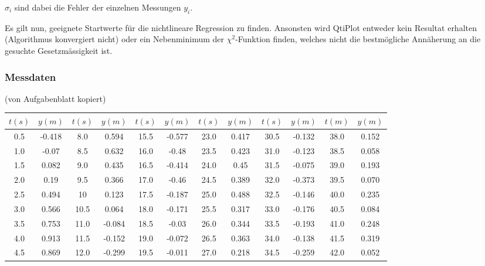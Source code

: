 $\sigma_i$ sind dabei die Fehler der einzelnen Messungen $y_i$.

Es  gilt  nun,  geeignete  Startwerte f\"ur  die  nichtlineare  Regression  zu
finden. Ansonsten wird  QtiPlot entweder  kein Resultat  erhalten (Algorithmus
konvergiert nicht) oder ein Nebenminimum der $\chi^2$-Funktion finden, welches
nicht die bestm\"ogliche Ann\"aherung an die gesuchte Gesetzm\"assigkeit ist.

\subsubsection{Messdaten}
(von Aufgabenblatt kopiert)

\begin{center}
    \begin{tabular}{*{12}{c}}
        \toprule
        $t(s)$  &  $y(m)$   &  $t(s)$   &  $y(m)$   &  $t(s)$  &  $y(m)$    &  $t(s)$   & $y(m)$    &  $t(s)$   &  $y(m)$   &  $t(m)$   &  $y(m)$ \\
        \midrule
        0.5     & -0.418    & 8.0       & 0.594     & 15.5     & -0.577     & 23.0      & 0.417     & 30.5      & -0.132    & 38.0      & 0.152   \\
        1.0     & -0.07     & 8.5       & 0.632     & 16.0     & -0.48      & 23.5      & 0.423     & 31.0      & -0.123    & 38.5      & 0.058   \\
        1.5     & 0.082     & 9.0       & 0.435     & 16.5     & -0.414     & 24.0      & 0.45      & 31.5      & -0.075    & 39.0      & 0.193   \\
        2.0     & 0.19      & 9.5       & 0.366     & 17.0     & -0.46      & 24.5      & 0.389     & 32.0      & -0.373    & 39.5      & 0.070   \\
        2.5     & 0.494     & 10        & 0.123     & 17.5     & -0.187     & 25.0      & 0.488     & 32.5      & -0.146    & 40.0      & 0.235   \\
        3.0     & 0.566     & 10.5      & 0.064     & 18.0     & -0.171     & 25.5      & 0.317     & 33.0      & -0.176    & 40.5      & 0.084   \\
        3.5     & 0.753     & 11.0      & -0.084    & 18.5     & -0.03      & 26.0      & 0.344     & 33.5      & -0.193    & 41.0      & 0.248   \\
        4.0     & 0.913     & 11.5      & -0.152    & 19.0     & -0.072     & 26.5      & 0.363     & 34.0      & -0.138    & 41.5      & 0.319   \\
        4.5     & 0.869     & 12.0      & -0.299    & 19.5     & -0.011     & 27.0      & 0.218     & 34.5      & -0.259    & 42.0      & 0.052   \\

\end{tabular}
\end{center}

